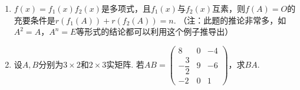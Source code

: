 \begin{enumerate}
    \item $f(x)=f_1(x)f_2(x)$是多项式，且$f_1(x)$与$f_2(x)$互素，则$f(A)=O$的充要条件是$r(f_1(A))+r(f_2(A))=n$. （注：此题的推论非常多，如$A^2=A$，$A^n=E$等形式的结论都可以利用这个例子推导出）

    \item 设$A,B$分别为$3 \times 2$和$2 \times 3$实矩阵. 若$AB=\begin{pmatrix}
                  8             & 0 & -4 \\[1ex]
                  -\dfrac{3}{2} & 9 & -6 \\[1ex]
                  -2            & 0 & 1
              \end{pmatrix}$，求$BA$.
\end{enumerate}
